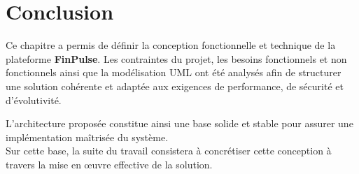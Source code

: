 \section{Conclusion}

Ce chapitre a permis de définir la conception fonctionnelle et technique de la plateforme \textbf{FinPulse}. Les contraintes du projet, les besoins fonctionnels et non fonctionnels ainsi que la modélisation UML ont été analysés afin de structurer une solution cohérente et adaptée aux exigences de performance, de sécurité et d’évolutivité.

L’architecture proposée constitue ainsi une base solide et stable pour assurer une implémentation maîtrisée du système. \\Sur cette base, la suite du travail consistera à concrétiser cette conception à travers la mise en œuvre effective de la solution.

